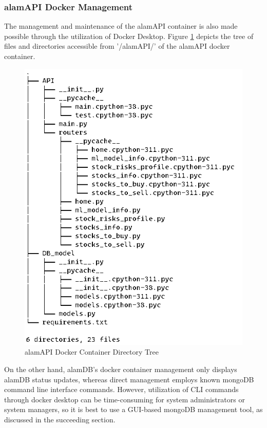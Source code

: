 \subsubsection{alamAPI Docker Management}
\label{subsubsec:alamAPI_docker_management}
The management and maintenance of the alamAPI container is 
also made possible through the utilization of Docker Desktop.
Figure \ref{fig:alamapi_tree} depicts the tree of files and directories accessible 
from '/alamAPI/' of the alamAPI docker container.
\begin{figure}[ht]
    \centering
    \includegraphics[height=0.40\textheight]{./assets/Chapter_4/Documentation/alamapi_tree.png}
    \caption{alamAPI Docker Container Directory Tree}
    \label{fig:alamapi_tree}
\end{figure}
\FloatBarrier

On the other hand, alamDB's docker container management only displays 
alamDB status updates, whereas direct management employs known mongoDB 
command line interface commands. 
However, utilization of CLI commands through docker desktop can be 
time-consuming for system administrators or system managers, 
so it is best to use a GUI-based mongoDB management tool, 
as discussed in the succeeding section.

